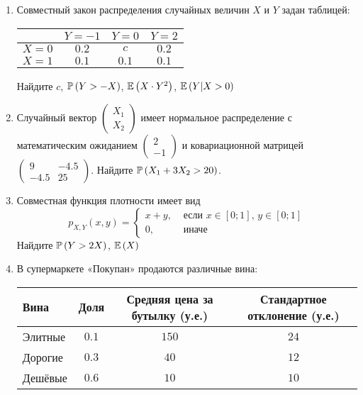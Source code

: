 \begin{enumerate}
\item Совместный закон распределения случайных величин  $X$  и  $Y$
задан таблицей:

\begin{center}
\begin{tabular}{@{}c|ccc@{}}
\toprule
    & $Y=-1$ & $Y=0$ & $Y=2$ \\ \midrule
$X=0$ & $0.2$  & $c$   & $0.2$ \\
$X=1$ & $0.1$  & $0.1$ & $0.1$ \\ \bottomrule
\end{tabular}
\end{center}

Найдите  $c$,  $\P\left(Y>-X\right)$,  $\E\left(X\cdot Y^{2} \right)$,  $\E\left(Y|X>0\right)$

\item Случайный вектор  $\left(\begin{array}{c}
{X_{1} } \\ {X_{2} }
\end{array}\right)$  имеет нормальное распределение с
математическим ожиданием  $\left(\begin{array}{c} {2} \\ {-1}
\end{array}\right)$  и ковариационной матрицей
$\left(\begin{array}{cc} {9} & {-4.5} \\ {-4.5} & {25}
\end{array}\right)$. Найдите  $\P\left(X_{1} +3X_{2} >20\right)$.

\item Совместная функция плотности имеет вид
\[
p_{X,Y} \left(x,y\right)=
\begin{cases}
x+y, & \text{ если } x\in \left[0;1\right],\, y\in \left[0;1\right] \\
0, & \text{ иначе}
\end{cases}
\]
Найдите  $\P\left(Y>2X\right)$,  $\E\left(X\right)$

\item В супермаркете «Покупан» продаются различные вина:

\begin{center}
\begin{tabular}{@{}lccc@{}}
\toprule
Вина    & Доля & Средняя цена за бутылку (у.е.) & Стандартное отклонение (у.е.) \\ \midrule
Элитные & $0.1$  & $150$                           & $24$                           \\
Дорогие & $0.3$  & $40$                             & $12$                            \\
Дешёвые & $0.6$  & $10$                             & $10$                            \\ \bottomrule
\end{tabular}
\end{center}


\end{enumerate}
